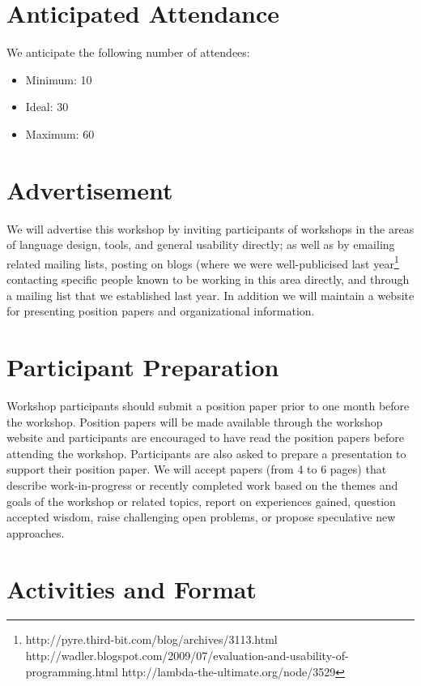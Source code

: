 \documentclass[authorpermission]{sigplanconf}
\begin{document}
\section{Anticipated Attendance}

We anticipate the following number of attendees:

\begin{itemize}
\item Minimum: 10 
\item Ideal: 30
\item Maximum: 60 
\end{itemize}

\section{Advertisement}

We will advertise this workshop by inviting participants of workshops
in the areas of language design, tools, and general usability
directly; as well as by emailing related mailing lists, posting on
blogs (where we were well-publicised last
year\footnote{http://pyre.third-bit.com/blog/archives/3113.html
http://wadler.blogspot.com/2009/07/evaluation-and-usability-of-programming.html
http://lambda-the-ultimate.org/node/3529}
contacting specific people known to be working in this area directly,
and through a mailing list that we established last year. In
addition we will maintain a website for presenting position papers and organizational
information.

\section{Participant Preparation}

Workshop participants should submit a position paper prior to one
month before the workshop. Position papers will be made available
through the workshop website and participants are encouraged to have
read the position papers before attending the workshop. Participants
are also asked to prepare a presentation to support their position
paper. We will accept papers (from 4 to 6 pages) that describe
work-in-progress or recently completed work based on the themes and
goals of the workshop or related topics, report on experiences gained,
question accepted wisdom, raise challenging open problems, or propose
speculative new approaches.

\section{Activities and Format}
\end{document}

